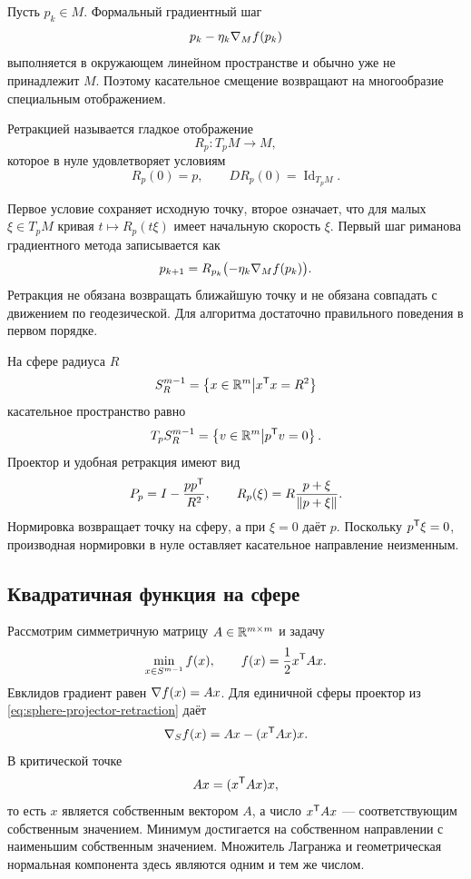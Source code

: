 Пусть $p_k\in M$. Формальный градиентный шаг
\[
p_k-\eta_k\nabla_M f(p_k)
\]
выполняется в окружающем линейном пространстве и обычно уже не принадлежит $M$. Поэтому касательное смещение возвращают на многообразие специальным отображением.

\begin{definition}
Ретракцией называется гладкое отображение
\[
R_p:T_pM\to M,
\]
которое в нуле удовлетворяет условиям
\[
R_p(0)=p,
\qquad
DR_p(0)=\operatorname{Id}_{T_pM}.
\]
\end{definition}

Первое условие сохраняет исходную точку, второе означает, что для малых $\xi\in T_pM$ кривая $t\mapsto R_p(t\xi)$ имеет начальную скорость $\xi$. Первый шаг риманова градиентного метода записывается как
\begin{equation}
\label{eq:riemannian-gradient-step}
p_{k+1}
=
R_{p_k}\bigl(-\eta_k\nabla_M f(p_k)\bigr).
\end{equation}
Ретракция не обязана возвращать ближайшую точку и не обязана совпадать с движением по геодезической. Для алгоритма достаточно правильного поведения в первом порядке.

На сфере радиуса $R$
\[
S_R^{m-1}=\left\{x\in\mathbb{R}^m\middle|x^{\mathsf{T}}x=R^2\right\}
\]
касательное пространство равно
\[
T_pS_R^{m-1}=\left\{v\in\mathbb{R}^m\middle|p^{\mathsf{T}}v=0\right\}.
\]
Проектор и удобная ретракция имеют вид
\begin{equation}
\label{eq:sphere-projector-retraction}
P_p=I-\frac{pp^{\mathsf{T}}}{R^2},
\qquad
R_p(\xi)=R\frac{p+\xi}{\lVert p+\xi\rVert}.
\end{equation}
Нормировка возвращает точку на сферу, а при $\xi=0$ даёт $p$. Поскольку $p^{\mathsf{T}}\xi=0$, производная нормировки в нуле оставляет касательное направление неизменным.

\subsection{Квадратичная функция на сфере}

Рассмотрим симметричную матрицу $A\in\mathbb{R}^{m\times m}$ и задачу
\begin{equation}
\label{eq:rayleigh-sphere-problem}
\min_{x\in S^{m-1}}
f(x),
\qquad
f(x)=\frac12x^{\mathsf{T}}Ax.
\end{equation}
Евклидов градиент равен $\nabla f(x)=Ax$. Для единичной сферы проектор из \eqref{eq:sphere-projector-retraction} даёт
\begin{equation}
\label{eq:rayleigh-riemannian-gradient}
\nabla_S f(x)
=
Ax-(x^{\mathsf{T}}Ax)x.
\end{equation}
В критической точке
\[
Ax=(x^{\mathsf{T}}Ax)x,
\]
то есть $x$ является собственным вектором $A$, а число $x^{\mathsf{T}}Ax$ --- соответствующим собственным значением. Минимум достигается на собственном направлении с наименьшим собственным значением. Множитель Лагранжа и геометрическая нормальная компонента здесь являются одним и тем же числом.

